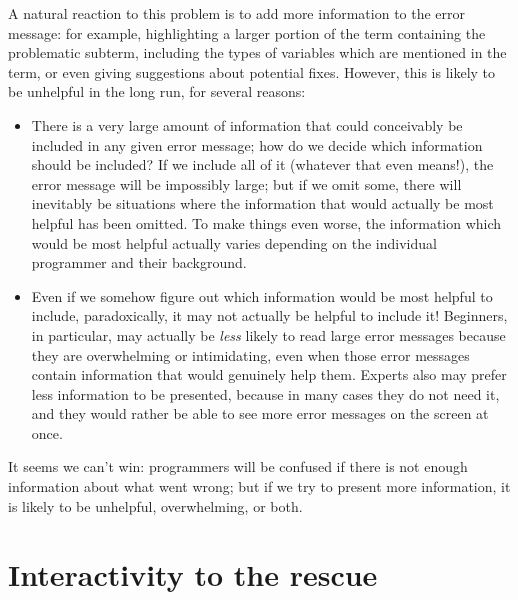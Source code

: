 \documentclass[sigplan, screen]{acmart}\settopmatter{printccs=false,printacmref=false}
\begin{document}
A natural reaction to this problem is to add more information to the
error message: for example, highlighting a larger portion of the term
containing the problematic subterm, including the types of variables
which are mentioned in the term, or even giving suggestions about
potential fixes.  However, this is likely to be unhelpful in the long
run, for several reasons:

\begin{itemize}
\item There is a very large amount of information that could
  conceivably be included in any given error message; how do we decide
  which information should be included?  If we include all of it
  (whatever that even means!), the error message will be impossibly
  large; but if we omit some, there will inevitably be situations
  where the information that would actually be most helpful has been
  omitted.  To make things even worse, the information which would be
  most helpful actually varies depending on the individual programmer
  and their background.
\item Even if we somehow figure out which information would be most
  helpful to include, paradoxically, it may not actually be helpful to
  include it!  Beginners, in particular, may actually be \emph{less}
  likely to read large error messages because they are overwhelming or
  intimidating, even when those error messages contain information
  that would genuinely help them.  Experts also may prefer less
  information to be presented, because in many cases they do not need
  it, and they would rather be able to see more error messages on the
  screen at once.
\end{itemize}

It seems we can't win: programmers will be confused if there is not enough
information about what went wrong; but if we try to present more
information, it is likely to be unhelpful, overwhelming, or both.

\section{Interactivity to the rescue}
\end{document}
